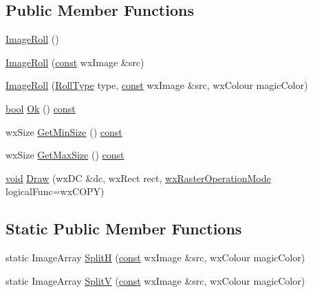 \subsection*{Public Member Functions}
\begin{DoxyCompactItemize}
\item 
\hyperlink{class_image_roll_a8fe2991b0a924d83e4a629f85f01a5ef}{Image\+Roll} ()
\item 
\hyperlink{class_image_roll_ac07dce05ec9dd35fdf5344bc089ac6c3}{Image\+Roll} (\hyperlink{getopt1_8c_a2c212835823e3c54a8ab6d95c652660e}{const} wx\+Image \&src)
\item 
\hyperlink{class_image_roll_ac9fce00c434a0d7dd992c54ec79e0c0e}{Image\+Roll} (\hyperlink{class_image_roll_a82fea9dd1b4fa9e6a864c3b3ca6ced2e}{Roll\+Type} type, \hyperlink{getopt1_8c_a2c212835823e3c54a8ab6d95c652660e}{const} wx\+Image \&src, wx\+Colour magic\+Color)
\item 
\hyperlink{mac_2config_2i386_2lib-src_2libsoxr_2soxr-config_8h_abb452686968e48b67397da5f97445f5b}{bool} \hyperlink{class_image_roll_a167d0bd930230bea8e0e0fa8276156e2}{Ok} () \hyperlink{getopt1_8c_a2c212835823e3c54a8ab6d95c652660e}{const} 
\item 
wx\+Size \hyperlink{class_image_roll_a13576e0fe6744eabeb3b246deaf1f120}{Get\+Min\+Size} () \hyperlink{getopt1_8c_a2c212835823e3c54a8ab6d95c652660e}{const} 
\item 
wx\+Size \hyperlink{class_image_roll_a1a44fa4aef370b0f24e9171a4d7ec613}{Get\+Max\+Size} () \hyperlink{getopt1_8c_a2c212835823e3c54a8ab6d95c652660e}{const} 
\item 
\hyperlink{sound_8c_ae35f5844602719cf66324f4de2a658b3}{void} \hyperlink{class_image_roll_a1e0a6aebebcb47ed0e8b1dc9442d6484}{Draw} (wx\+DC \&dc, wx\+Rect rect, \hyperlink{_image_roll_8h_a3bd7816d34a03863743710178ff6be2d}{wx\+Raster\+Operation\+Mode} logical\+Func=wx\+C\+O\+PY)
\end{DoxyCompactItemize}
\subsection*{Static Public Member Functions}
\begin{DoxyCompactItemize}
\item 
static Image\+Array \hyperlink{class_image_roll_ad47c595147d000e18b6ef215fa9a69d1}{SplitH} (\hyperlink{getopt1_8c_a2c212835823e3c54a8ab6d95c652660e}{const} wx\+Image \&src, wx\+Colour magic\+Color)
\item 
static Image\+Array \hyperlink{class_image_roll_a547d2a7f542cf910015efb28d17fdd69}{SplitV} (\hyperlink{getopt1_8c_a2c212835823e3c54a8ab6d95c652660e}{const} wx\+Image \&src, wx\+Colour magic\+Color)
\end{DoxyCompactItemize}
